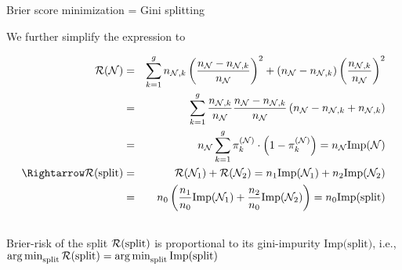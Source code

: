 \documentclass[11pt,compress,t,notes=noshow, xcolor=table]{beamer}
\begin{document}
\begin{vbframe}{Brier score minimization = Gini splitting}

\begin{footnotesize}
We further simplify the expression to

\begin{eqnarray*}
\risk(\Np) &=&  \sum_{k = 1}^g n_{\Np,k}\left(\frac{n_{\Np } - n_{\Np,k}}{n_{\Np }}\right)^2 + (n_{\Np } - n_{\Np,k})\left(\frac{n_{\Np,k}}{n_{\Np }}\right)^2 \\
&=& \sum_{k = 1}^g \frac{n_{\Np,k}}{n_{\Np }} \frac{n_{\Np } - n_{\Np,k}}{n_{\Np }} \left(n_{\Np } - n_{\Np,k } + n_{\Np,k}\right) \\
&=& n_{\Np } \sum_{k = 1}^g \pikN \cdot \left(1 - \pikN \right) = n_\Np \text{Imp}(\Np)\\
 \Rightarrow \risk(\text{split}) &=& \risk(\Np_1) + \risk(\Np_2)  = n_1 \text{Imp}(\Np_1) + n_2 \text{Imp}(\Np_2)\\
 &=&n_0 \left(\frac{n_1}{n_0} \text{Imp}(\Np_1) + \frac{n_2}{n_0} \text{Imp}(\Np_2)\right) = n_0\text{Imp(split)}\\
\
\end{eqnarray*} 
Brier-risk of the split $\mathcal{R}(\text{split})$ is proportional to its gini-impurity $\text{Imp(split)}$, i.e., $\mathop{\mathrm{arg\,min}}_\text{split} \mathcal{R}(\text{split}) = \mathop{\mathrm{arg\,min}}_\text{split} \text{Imp(split)}$\\

\end{footnotesize}

\end{vbframe}


\endlecture
\end{document}
